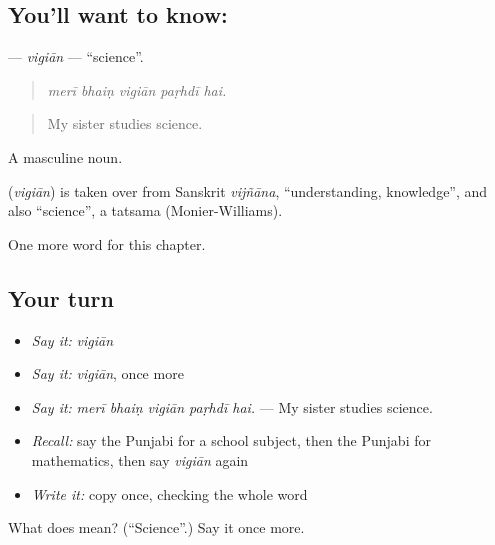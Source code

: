 \subsection*{You'll want to know: }
\textbf{} — \emph{vigiān} — \textquotedblleft{}science\textquotedblright{}.

\begin{quote}
    
\end{quote}

\begin{quote}
\emph{merī bhaiṇ vigiān paṛhdī hai.}
\end{quote}

\begin{quote}
My sister studies science.
\end{quote}

A masculine noun.

\begin{cousinweb}
\textbf{} (\emph{vigiān}) is taken over from Sanskrit \emph{vijñāna}, \textquotedblleft{}understanding, knowledge\textquotedblright{}, and also \textquotedblleft{}science\textquotedblright{}, a tatsama (Monier-Williams).
\end{cousinweb}

\begin{grammarlens}[title={What you've built}]
One more word for this chapter.
\end{grammarlens}

\subsection*{Your turn}
\begin{itemize}
\raggedright
  \item \emph{Say it:} \emph{vigiān}
  \item \emph{Say it:} \emph{vigiān}, once more
  \item \emph{Say it:} \emph{merī bhaiṇ vigiān paṛhdī hai.} — My sister studies science.
  \item \emph{Recall:} say the Punjabi for a school subject, then the Punjabi for mathematics, then say \emph{vigiān} again
  \item \emph{Write it:} copy \textbf{} once, checking the whole word
\end{itemize}

\begin{tcolorbox}[breakable,colback=teal!4,colframe=teal!35!black,title={Before you move on}]
What does  mean? (\textquotedblleft{}Science\textquotedblright{}.) Say it once more.
\end{tcolorbox}
